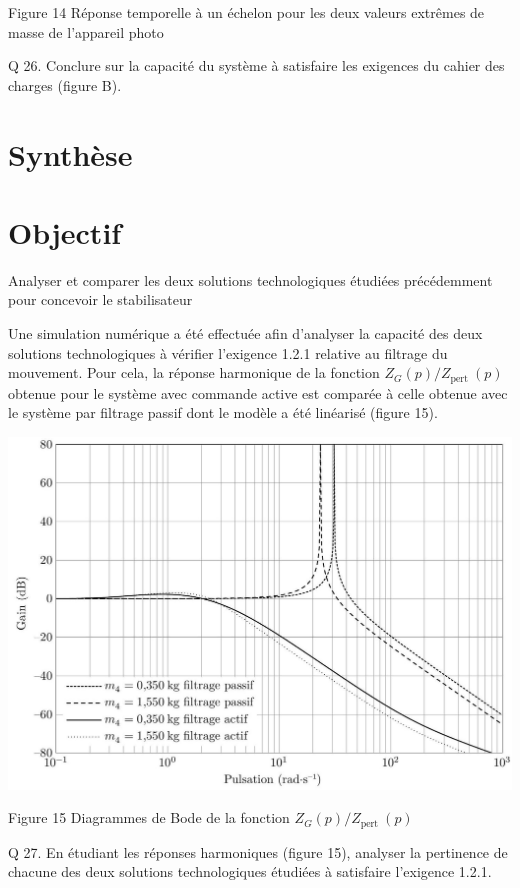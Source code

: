 \documentclass[10pt]{article}
\begin{document}
Figure 14 Réponse temporelle à un échelon pour les deux valeurs extrêmes de masse de l'appareil photo

Q 26. Conclure sur la capacité du système à satisfaire les exigences du cahier des charges (figure B).

\section{Synthèse}
\section{Objectif}
Analyser et comparer les deux solutions technologiques étudiées précédemment pour concevoir le stabilisateur

Une simulation numérique a été effectuée afin d'analyser la capacité des deux solutions technologiques à vérifier l'exigence 1.2.1 relative au filtrage du mouvement. Pour cela, la réponse harmonique de la fonction $Z_{G}(p) / Z_{\text {pert }}(p)$ obtenue pour le système avec commande active est comparée à celle obtenue avec le système par filtrage passif dont le modèle a été linéarisé (figure 15).

\begin{center}
\includegraphics[max width=\textwidth]{2022_12_31_ed674c1a831ea1bff3a0g-11}
\end{center}

Figure 15 Diagrammes de Bode de la fonction $Z_{G}(p) / Z_{\text {pert }}(p)$

Q 27. En étudiant les réponses harmoniques (figure 15), analyser la pertinence de chacune des deux solutions technologiques étudiées à satisfaire l'exigence 1.2.1.
\end{document}
